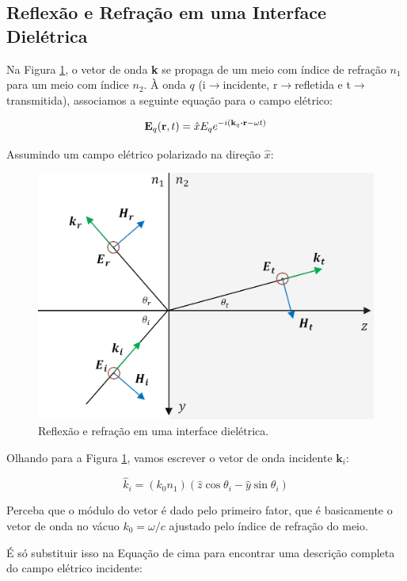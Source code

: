 \documentclass[12pt,a4paper]{report}
\begin{document}
\subsection{Reflexão e Refração em uma Interface Dielétrica}\label{reflexão.refraçaõ.interface}

Na Figura \ref{interface}, o vetor de onda \textbf{k} se propaga de um meio com índice de refração $n_1$ para um meio com índice $n_2$. À onda $q$ (i$\rightarrow$incidente, r$\rightarrow$refletida e t$\rightarrow$transmitida), associamos a seguinte equação para o campo elétrico:

\begin{equation}
    \textbf{E}_q(\textbf{r},t)=\hat{x}E_qe^{-i(\textbf{k}_q\vdot\textbf{r}-\omega t)}
\end{equation}

Assumindo um campo elétrico polarizado na direção $\hat{x}$:

\begin{figure}[H]
    \centering
    \includegraphics[width=0.8\linewidth]{bouindary.png}
    \caption{Reflexão e refração em uma interface dielétrica.}
    \label{interface}
\end{figure}

Olhando para a Figura \ref{interface}, vamos escrever o vetor de onda incidente $\textbf{k}_i$:

\begin{equation*}
    \hat{k}_i=(k_0n_1)(\hat{z}\cos\theta_i-\hat{y}\sin\theta_i)
\end{equation*}

Perceba que o módulo do vetor é dado pelo primeiro fator, que é basicamente o vetor de onda no vácuo $k_0=\omega/c$ ajustado pelo índice de refração do meio.

É só substituir isso na Equação de cima para encontrar uma descrição completa do campo elétrico incidente:
\end{document}
